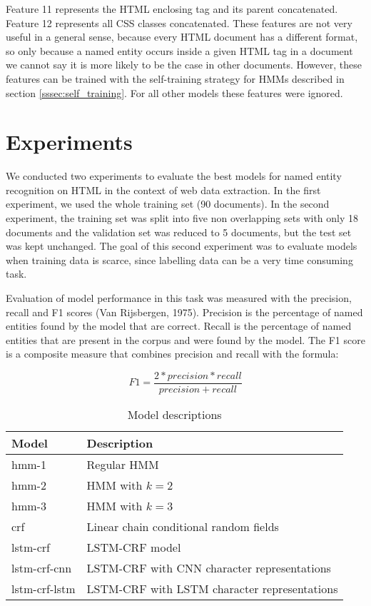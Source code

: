 \documentclass[sigconf]{acmart}
\begin{document}
Feature 11 represents the HTML enclosing tag and its parent concatenated. Feature 12
represents all CSS classes concatenated. These features are not very useful in a general
sense, because every HTML document has a different format, so only because a named entity
occurs inside a given HTML tag in a document we cannot say it is more likely to be the case 
in other documents. However, these features can be trained with the self-training strategy 
for HMMs described in section \ref{sssec:self_training}. For all other models these features 
were ignored.

\section{Experiments}

We conducted two experiments to evaluate the best models for named entity recognition
on HTML in the context of web data extraction. In the first experiment, we used the
whole training set (90 documents). In the second experiment, the training set was split 
into five non overlapping sets with only 18 documents and the validation set was reduced 
to 5 documents, but the test set was kept unchanged. The goal of this second experiment 
was to evaluate models when training data is scarce, since labelling data can be a very 
time consuming task.

Evaluation of model performance in this task was measured with the precision, recall and 
F1 scores (Van Rijsbergen, 1975). Precision is the percentage of named entities found by 
the model that are correct. Recall is the percentage of named entities that are present
in the corpus and were found by the model. The F1 score is a composite measure that combines
precision and recall with the formula:

\begin{equation}
F1 = \frac{2 * precision * recall}{precision + recall}
\end{equation}

\begin{table}[h]
  \small
  \begin{center}
    \begin{tabular}{ |l|l| }
      \hline
      Model & Description \\
      \hline
      hmm-1         & Regular HMM \\
      hmm-2         & HMM with $ k=2 $ \\
      hmm-3         & HMM with $ k=3 $ \\
      crf           & Linear chain conditional random fields \\
      lstm-crf      & LSTM-CRF model \cite{Huang2015} \\
      lstm-crf-cnn  & LSTM-CRF with CNN character representations \cite{Ma2016} \\
      lstm-crf-lstm & LSTM-CRF with LSTM character representations \cite{Lample2016} \\
      \hline
    \end{tabular}
  \end{center}
  \caption{Model descriptions}
  \label{tab:models}
\end{table}
\end{document}
